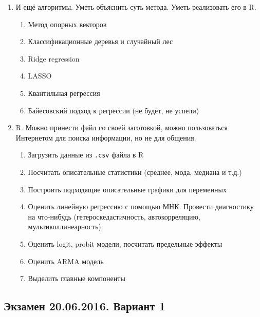 \documentclass[12pt, a4paper]{article}\usepackage[]{graphicx}\usepackage[]{color}
\begin{document}
\begin{enumerate}
\item И ещё алгоритмы. Уметь объяснить суть метода. Уметь реализовать его в R. %
\begin{enumerate}
\item Метод опорных векторов
\item Классификационные деревья и случайный лес
\item Ridge regression
\item LASSO
\item Квантильная регрессия
\item Байесовский подход к регрессии (не будет, не успели)
\end{enumerate}


\item R. Можно принести файл со своей заготовкой, можно пользоваться Интернетом для поиска информации, но не для общения.
\begin{enumerate}
\item Загрузить данные из \verb|.csv| файла в R
\item Посчитать описательные статистики (среднее, мода, медиана и т.д.)
\item Построить подходящие описательные графики для переменных
\item Оценить линейную регрессию с помощью МНК. Провести диагностику на что-нибудь (гетероскедастичность, автокорреляцию, мультиколлинеарность).
\item Оценить logit, probit модели, посчитать предельные эффекты
\item Оценить ARMA модель
\item Выделить главные компоненты
\end{enumerate}


\end{enumerate}


\subsection{Экзамен 20.06.2016. Вариант 1}
\end{document}
